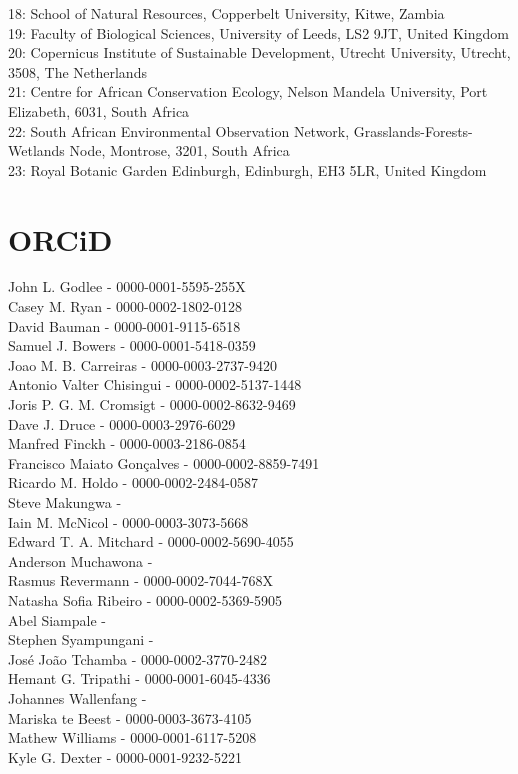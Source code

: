 \documentclass[11pt,a4paper]{article}
\begin{document}
18: School of Natural Resources, Copperbelt University, Kitwe, Zambia \\
19: Faculty of Biological Sciences, University of Leeds, LS2 9JT, United Kingdom\\
20: Copernicus Institute of Sustainable Development, Utrecht University, Utrecht, 3508, The Netherlands \\
21: Centre for African Conservation Ecology, Nelson Mandela University, Port Elizabeth, 6031, South Africa \\
22: South African Environmental Observation Network, Grasslands-Forests-Wetlands Node, Montrose, 3201, South Africa \\
23: Royal Botanic Garden Edinburgh, Edinburgh, EH3 5LR, United Kingdom \\

\newpage
\section*{ORCiD}

John L. Godlee - 0000-0001-5595-255X \\
Casey M. Ryan - 0000-0002-1802-0128 \\
David Bauman - 0000-0001-9115-6518 \\
Samuel J. Bowers - 0000-0001-5418-0359 \\
Joao M. B. Carreiras - 0000-0003-2737-9420 \\
Antonio Valter Chisingui - 0000-0002-5137-1448 \\
Joris P. G. M. Cromsigt - 0000-0002-8632-9469 \\
Dave J. Druce - 0000-0003-2976-6029 \\
Manfred Finckh - 0000-0003-2186-0854 \\
Francisco Maiato Gon\c{c}alves - 0000-0002-8859-7491 \\
Ricardo M. Holdo - 0000-0002-2484-0587 \\
Steve Makungwa -  \\
Iain M. McNicol - 0000-0003-3073-5668 \\
Edward T. A. Mitchard - 0000-0002-5690-4055 \\
Anderson Muchawona -  \\
Rasmus Revermann - 0000-0002-7044-768X \\
Natasha Sofia Ribeiro - 0000-0002-5369-5905 \\
Abel Siampale -  \\
Stephen Syampungani -  \\
Jos\'{e} Jo\~{a}o Tchamba - 0000-0002-3770-2482 \\
Hemant G. Tripathi - 0000-0001-6045-4336 \\
Johannes Wallenfang -  \\
Mariska te Beest - 0000-0003-3673-4105 \\
Mathew Williams - 0000-0001-6117-5208 \\
Kyle G. Dexter - 0000-0001-9232-5221 \\
\end{document}
